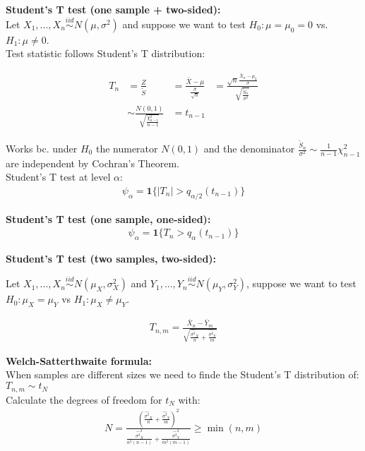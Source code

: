 \textbf{Student's T test (one sample + two-sided):}\\

Let $X_1, ..., X_n \stackrel{iid}{\sim} N(\mu,\sigma^2)$ and suppose we want to test $H_0: \mu = \mu_0 = 0$ vs. $H_1: \mu \neq 0$.\\

Test statistic follows Student's T distribution:

\begin{align*}
T_n &= \frac{Z}{\tilde{S}} &= \frac{\bar{X}-\mu}{\frac{\hat{\sigma}}{\sqrt{n}}} &=\frac{\displaystyle \sqrt{n}\frac{\bar{X}_n - \mu_0}{\sigma}}{\displaystyle \sqrt{\frac{\tilde{S}_n}{\sigma^2}}}\\
&\sim \frac{N(0,1)}{\sqrt{\frac{\chi^2_{n-1}}{n-1}}}
&= t_{n-1}
\end{align*}

Works bc. under $H_0$ the numerator $N(0,1)$ and the denominator $\frac{\tilde{S}_n}{\sigma^2} \sim \frac1{n-1}\chi^2_{n-1}$ are independent by Cochran's Theorem.\\

Student's T test at level $\alpha$:
\begin{align*}
\psi_\alpha = \textbf{1}\{|T_n| > q_{\alpha/2}(t_{n-1})\}
\end{align*}

\textbf{Student's T test (one sample, one-sided):}
\begin{align*}
\psi_\alpha = \textbf{1}\{T_n > q_\alpha(t_{n-1})\}
\end{align*}

\textbf{Student's T test (two samples, two-sided):}

Let $X_1, ..., X_n \stackrel{iid}{\sim} N(\mu_X,\sigma^2_X)$ and $Y_1, ..., Y_n \stackrel{iid}{\sim} N(\mu_Y,\sigma^2_Y)$, suppose we want to test $H_0: \mu_X = \mu_Y$ vs $H_1: \mu_X \neq \mu_Y$.

\begin{align*}
T_{n, m} = \frac{\bar{X}_n - \bar{Y}_m}{\displaystyle \sqrt{\frac{\hat{\sigma^2}_X}n + \frac{\hat{\sigma^2}_Y}m}}
\end{align*}


\textbf{Welch-Satterthwaite formula:}\\

When samples are different sizes we need to finde the Student's T distribution of: $T_{n, m} \sim t_N$\\

Calculate the degrees of freedom for $t_N$ with:
\begin{align*}
N = \frac{\displaystyle \left(\frac{\hat{\sigma^2}_X}n + \frac{\hat{\sigma^2}_Y}m\right)^2}{\displaystyle \frac{\hat{\sigma^2}^2_X}{n^2(n-1)} + \frac{\hat{\sigma^2}^2_Y}{m^2(m-1)}} \geq \min(n, m)
\end{align*}

